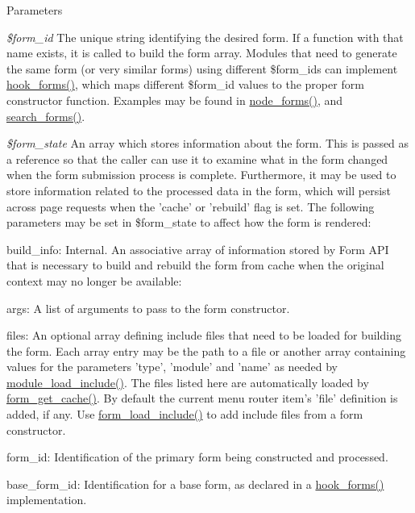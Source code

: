 \begin{DoxyParams}{Parameters}
\item[{\em \$form\_\-id}]The unique string identifying the desired form. If a function with that name exists, it is called to build the form array. Modules that need to generate the same form (or very similar forms) using different \$form\_\-ids can implement \hyperlink{group__hooks_gaa764fee74b85797f75c0c923cad628d5}{hook\_\-forms()}, which maps different \$form\_\-id values to the proper form constructor function. Examples may be found in \hyperlink{node_8module_aeb7774b7406a9dcba3c7f587a520df31}{node\_\-forms()}, and \hyperlink{search_8module_a3396c4111908648bd2d0ddff911449fa}{search\_\-forms()}. \item[{\em \$form\_\-state}]An array which stores information about the form. This is passed as a reference so that the caller can use it to examine what in the form changed when the form submission process is complete. Furthermore, it may be used to store information related to the processed data in the form, which will persist across page requests when the 'cache' or 'rebuild' flag is set. The following parameters may be set in \$form\_\-state to affect how the form is rendered:
\begin{DoxyItemize}
\item build\_\-info: Internal. An associative array of information stored by Form API that is necessary to build and rebuild the form from cache when the original context may no longer be available:
\begin{DoxyItemize}
\item args: A list of arguments to pass to the form constructor.
\item files: An optional array defining include files that need to be loaded for building the form. Each array entry may be the path to a file or another array containing values for the parameters 'type', 'module' and 'name' as needed by \hyperlink{module_8inc_a49098ed4d33650ee5ab52aab40982423}{module\_\-load\_\-include()}. The files listed here are automatically loaded by \hyperlink{group__form__api_gab1da3001a3773a949188b52f61a9cd09}{form\_\-get\_\-cache()}. By default the current menu router item's 'file' definition is added, if any. Use \hyperlink{group__form__api_ga9c29fd030cf29d55e40f849de8dde040}{form\_\-load\_\-include()} to add include files from a form constructor.
\item form\_\-id: Identification of the primary form being constructed and processed.
\item base\_\-form\_\-id: Identification for a base form, as declared in a \hyperlink{group__hooks_gaa764fee74b85797f75c0c923cad628d5}{hook\_\-forms()} implementation.

\end{DoxyItemize}
\end{DoxyItemize}
\end{DoxyParams}
